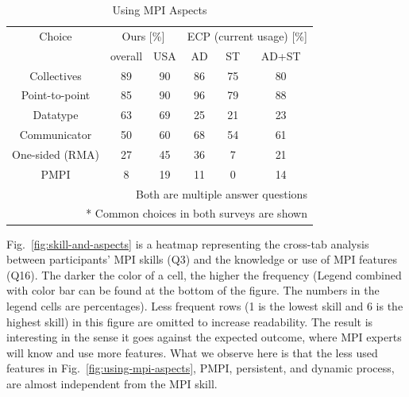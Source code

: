 \documentclass[preprint,5p,times]{elsarticle}
\begin{document}
\begin{table}[htb]%
  \begin{center}%
    \caption{Using MPI Aspects}\label{tab:using-mpi-aspects}%
    \begin{tabular}{c||c|c||c|c|c}%
      \hline%
      Choice & \multicolumn{2}{c||}{Ours [\%]} &
      \multicolumn{3}{c}{ECP {\scriptsize (current usage)} [\%]} \\
      \cline{2-6}%
      & overall & USA & AD & ST & {\small AD+ST} \\
      \hline%
      Collectives & 89 & 90 & 86 & 75 & 80 \\
      Point-to-point & 85 & 90 & 96 & 79 & 88 \\
      Datatype & 63 & 69 & 25 & 21 & 23 \\
      Communicator & 50 & 60 & 68 & 54 & 61 \\
      {\small One-sided (RMA)} & 27 & 45 & 36 & 7 & 21 \\
      PMPI & 8 & 19 & 11 & 0 & 14 \\
      \hline%
      \multicolumn{6}{r}{\small * Both are multiple answer questions} \\
      \multicolumn{6}{r}{\small ** Common choices in both surveys are shown}\\
    \end{tabular}%
  \end{center}%
\end{table}%

Fig.~\ref{fig:skill-and-aspects} is a heatmap representing the cross-tab
analysis between participants' MPI skills (Q3) and the knowledge or use of MPI
features (Q16). The darker the color of a cell, the higher the frequency (Legend
combined with color bar can be found at the bottom of the figure. The numbers in
the legend cells are percentages). Less frequent rows (1 is the lowest skill and
6 is the highest skill) in this figure are omitted to increase readability. The
result is interesting in the sense it goes against the expected outcome, where
MPI experts will know and use more features. What we observe here is that the
less used features in Fig.~\ref{fig:using-mpi-aspects}, PMPI, persistent, and
dynamic process, are almost independent from the MPI skill.

\end{document}
